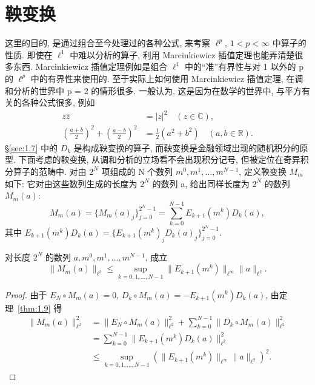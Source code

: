
\section{鞅变换}\label{sec:1.8}




这里的目的, 是通过组合至今处理过的各种公式, 来考察 $\ell^{p}$, $1 < p < \infty$ 中算子的性质. 即使在 $\ell^{1}$ 中难以分析的算子, 利用 Marcinkiewicz 插值定理也能弄清楚很多东西. Marcinkiewicz 插值定理例如是组合 $\ell^{1}$ 中的``准''有界性与对 1 以外的 p 的 $\ell^{p}$ 中的有界性来使用的. 至于实际上如何使用 Marcinkiewicz 插值定理, 在调和分析的世界中 p = 2 的情形很多. 一般认为, 这是因为在数学的世界中, 与平方有关的各种公式很多, 例如
\begin{align*}
z\overline{z} &= |z|^{2} \quad (z \in \mathbb{C}), \\
\left(\frac{a+b}{2}\right)^{2} + \left(\frac{a-b}{2}\right)^{2} &= \frac{1}{2}(a^{2}+b^{2}) \quad (a, b \in \mathbb{R}).
\end{align*}
§\ref{sec:1.7} 中的 $D_{k}$ 是构成鞅变换的算子, 而鞅变换是金融领域出现的随机积分的原型. 下面考虑的鞅变换, 从调和分析的立场看不会出现积分记号, 但被定位在奇异积分算子的范畴中. 对由 $2^{N}$ 项组成的 N 个数列 $m^{0}, m^{1}, \ldots, m^{N-1}$, 定义鞅变换 $M_{m}$ 如下: 它对由这些数列生成的长度为 $2^{N}$ 的数列 a, 给出同样长度为 $2^{N}$ 的数列 $M_{m}(a)$:
\[
M_{m}(a) = \{M_{m}(a)_{j}\}_{j=0}^{2^{N}-1} = \sum_{k=0}^{N-1}E_{k+1}(m^{k})D_{k}(a),
\]
其中 $E_{k+1}(m^{k})D_{k}(a) = \{E_{k+1}(m^{k})_{j}D_{k}(a)_{j}\}_{j=0}^{2^{N}-1}$.

\begin{theorem}\label{thm:1.10}
对长度 $2^{N}$ 的数列 $a, m^{0}, m^{1}, \ldots, m^{N-1}$, 成立
\[
\|M_{m}(a)\|_{\ell^{2}} \leq \sup_{k=0,1,\ldots,N-1}\|E_{k+1}(m^{k})\|_{\ell^{\infty}}\|a\|_{\ell^{2}}.
\]
\end{theorem}

\begin{proof}
由于 $E_{N} \circ M_{m}(a) = 0$, $D_{k} \circ M_{m}(a) = -E_{k+1}(m^{k})D_{k}(a)$, 由定理~\ref{thm:1.9} 得
\begin{align*}
\|M_{m}(a)\|_{\ell^{2}}^{2} &= \|E_{N} \circ M_{m}(a)\|_{\ell^{2}}^{2} + \sum_{k=0}^{N-1}\|D_{k} \circ M_{m}(a)\|_{\ell^{2}}^{2} \\
&= \sum_{k=0}^{N-1}\|E_{k+1}(m^{k})D_{k}(a)\|_{\ell^{2}}^{2} \\
&\leq \sup_{k=0,1,\ldots,N-1}(\|E_{k+1}(m^{k})\|_{\ell^{\infty}}\|a\|_{\ell^{2}})^{2}.
\end{align*}
\end{proof}

